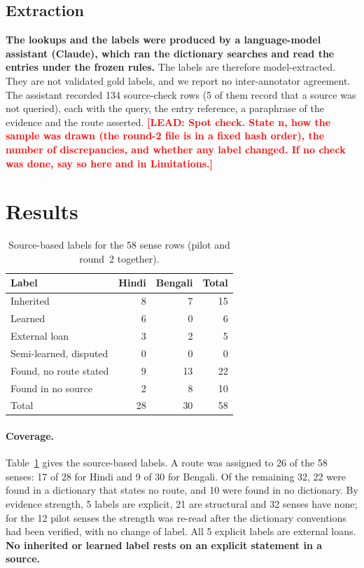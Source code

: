 \documentclass[11pt]{article}
\newcommand{\lead}[1]{\textcolor{red}{\textbf{[LEAD: #1]}}}
\begin{document}
\subsection{Extraction}
\label{sec:extraction}

\textbf{The lookups and the labels were produced by a language-model assistant (Claude), which ran the dictionary searches and read the entries under the frozen rules.} The labels are therefore model-extracted. They are not validated gold labels, and we report no inter-annotator agreement. The assistant recorded 134 source-check rows (5 of them record that a source was not queried), each with the query, the entry reference, a paraphrase of the evidence and the route asserted. \lead{Spot check. State n, how the sample was drawn (the round-2 file is in a fixed hash order), the number of discrepancies, and whether any label changed. If no check was done, say so here and in Limitations.}

\section{Results}

\begin{table}[t]
\centering\small
\begin{tabular}{lrrr}
\toprule
\textbf{Label} & \textbf{Hindi} & \textbf{Bengali} & \textbf{Total} \\
\midrule
Inherited & 8 & 7 & 15 \\
Learned & 6 & 0 & 6 \\
External loan & 3 & 2 & 5 \\
Semi-learned, disputed & 0 & 0 & 0 \\
\midrule
Found, no route stated & 9 & 13 & 22 \\
Found in no source & 2 & 8 & 10 \\
\midrule
Total & 28 & 30 & 58 \\
\bottomrule
\end{tabular}
\caption{Source-based labels for the 58 sense rows (pilot and round~2 together).}
\label{tab:labels}
\end{table}

\paragraph{Coverage.} Table~\ref{tab:labels} gives the source-based labels. A route was assigned to 26 of the 58 senses: 17 of 28 for Hindi and 9 of 30 for Bengali. Of the remaining 32, 22 were found in a dictionary that states no route, and 10 were found in no dictionary. By evidence strength, 5 labels are explicit, 21 are structural and 32 senses have none; for the 12 pilot senses the strength was re-read after the dictionary conventions had been verified, with no change of label. All 5 explicit labels are external loans. \textbf{No inherited or learned label rests on an explicit statement in a source.}
\end{document}
